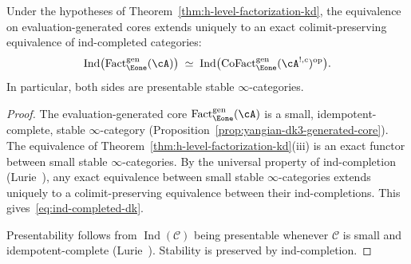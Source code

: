 \begin{theorem}
\label{thm:ind-completed-extension}
Under the hypotheses of
Theorem~\textup{\ref{thm:h-level-factorization-kd}},
the equivalence on evaluation-generated cores extends uniquely
to an exact colimit-preserving equivalence of ind-completed
categories:
\begin{equation}\label{eq:ind-completed-dk}
\operatorname{Ind}\bigl(
 \operatorname{Fact}_{\Eone}^{\mathrm{gen}}(\cA)
\bigr)
\;\simeq\;
\operatorname{Ind}\bigl(
 \operatorname{CoFact}_{\Eone}^{\mathrm{gen}}(\cA^{!,c})
 ^{\mathrm{op}}
\bigr).
\end{equation}
In particular, both sides are presentable stable
$\infty$-categories.
\end{theorem}

\begin{proof}
The evaluation-generated core
$\operatorname{Fact}_{\Eone}^{\mathrm{gen}}(\cA)$ is a small,
idempotent-complete, stable $\infty$-category
(Proposition~\ref{prop:yangian-dk3-generated-core}). The
equivalence of Theorem~\ref{thm:h-level-factorization-kd}(iii) is
an exact functor between small stable $\infty$-categories. By
the universal property of ind-completion
(Lurie~\cite[Prop.~5.3.5.10]{HTT}), any exact equivalence between
small stable $\infty$-categories extends uniquely to a
colimit-preserving equivalence between their ind-completions.
This gives~\eqref{eq:ind-completed-dk}.

Presentability follows from $\operatorname{Ind}(\mathcal{C})$
being presentable whenever $\mathcal{C}$ is small and
idempotent-complete (Lurie~\cite[Prop.~5.5.7.8]{HTT}).
Stability is preserved by ind-completion.
\end{proof}

